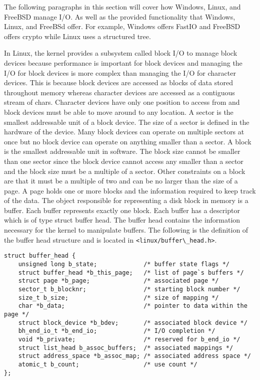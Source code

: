 \documentclass[letterpaper,10pt,onecolumn,draftclsnofoot,]{article}
\begin{document}

The following paragraphs in this section will cover how Windows, Linux, and FreeBSD manage I/O. As well as the provided functionality that Windows, Linux, and FreeBSd offer. For example, Windows offers FastIO and FreeBSD offers crypto while Linux uses a structured tree.

In Linux, the kernel provides a subsystem called block I/O to manage block devices because performance is important for block devices and managing the I/O for block devices is more complex than managing the I/O for character devices. This is because block devices are accessed as blocks of data stored throughout memory whereas character devices are accessed as a contiguous stream of chars. Character devices have only one position to access from and block devices must be able to move around to any location. A sector is the smallest addressable unit of a block device. The size of a sector is defined in the hardware of the device. Many block devices can operate on multiple sectors at once but no block device can operate on anything smaller than a sector. A block is the smallest addressable unit in software. The block size cannot be smaller than one sector since the block device cannot access any smaller than a sector and the block size must be a multiple of a sector. Other constraints on a block are that it must be a multiple of two and can be no larger than the size of a page. A page holds one or more blocks and the information required to keep track of the data. The object responsible for representing a disk block in memory is a buffer. Each buffer represents exactly one block. Each buffer has a descriptor which is of type struct buffer head. The buffer head contains the information necessary for the kernel to manipulate buffers. The following is the definition of the buffer head structure and is located in \verb|<linux/buffer\_head.h>|.

\begin{lstlisting}
struct buffer_head {
    unsigned long b_state;             /* buffer state flags */
    struct buffer_head *b_this_page;   /* list of page`s buffers */
    struct page *b_page;               /* associated page */
    sector_t b_blocknr;                /* starting block number */
    size_t b_size;                     /* size of mapping */
    char *b_data;                      /* pointer to data within the page */
    struct block_device *b_bdev;       /* associated block device */
    bh_end_io_t *b_end_io;             /* I/O completion */
    void *b_private;                   /* reserved for b_end_io */
    struct list_head b_assoc_buffers;  /* associated mappings */
    struct address_space *b_assoc_map; /* associated address space */
    atomic_t b_count;                  /* use count */
};
\end{lstlisting}
\end{document}
